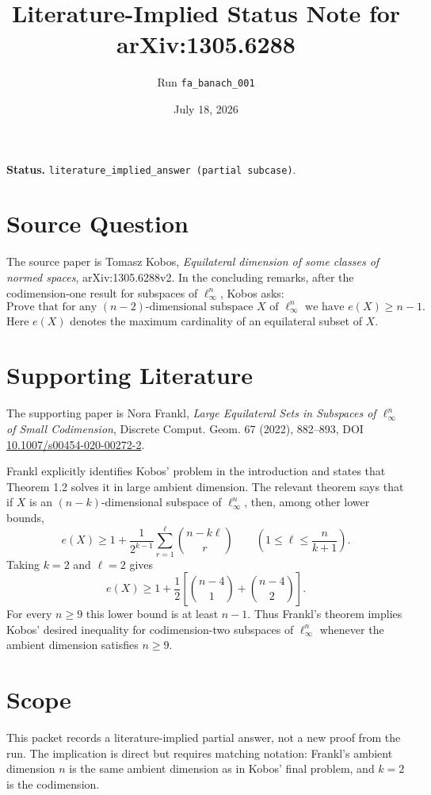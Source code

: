 \documentclass[11pt]{article}
\title{Literature-Implied Status Note for arXiv:1305.6288}
\author{Run \texttt{fa\_banach\_001}}
\date{July 18, 2026}
\begin{document}
\maketitle

\noindent\textbf{Status.}
\texttt{literature\_implied\_answer (partial subcase)}.

\section*{Source Question}

The source paper is Tomasz Kobos, \emph{Equilateral dimension of some classes
of normed spaces}, arXiv:1305.6288v2.  In the concluding remarks, after the
codimension-one result for subspaces of $\ell_\infty^n$, Kobos asks:
\[
\text{Prove that for any }(n-2)\text{-dimensional subspace }X
\text{ of }\ell_\infty^n\text{ we have }e(X)\ge n-1.
\]
Here $e(X)$ denotes the maximum cardinality of an equilateral subset of $X$.

\section*{Supporting Literature}

The supporting paper is Nora Frankl, \emph{Large Equilateral Sets in Subspaces
of $\ell_\infty^n$ of Small Codimension}, Discrete Comput. Geom. 67 (2022),
882--893, DOI
\href{https://doi.org/10.1007/s00454-020-00272-2}{10.1007/s00454-020-00272-2}.

Frankl explicitly identifies Kobos' problem in the introduction and states that
Theorem 1.2 solves it in large ambient dimension.  The relevant theorem says
that if $X$ is an $(n-k)$-dimensional subspace of $\ell_\infty^n$, then, among
other lower bounds,
\[
e(X)\ge
1+\frac{1}{2^{k-1}}\sum_{r=1}^{\ell}\binom{n-k\ell}{r}
\qquad
\left(1\le \ell\le \frac{n}{k+1}\right).
\]
Taking $k=2$ and $\ell=2$ gives
\[
e(X)\ge 1+\frac12\left[\binom{n-4}{1}+\binom{n-4}{2}\right].
\]
For every $n\ge 9$ this lower bound is at least $n-1$.  Thus Frankl's theorem
implies Kobos' desired inequality for codimension-two subspaces of
$\ell_\infty^n$ whenever the ambient dimension satisfies $n\ge 9$.

\section*{Scope}

This packet records a literature-implied partial answer, not a new proof from
the run.  The implication is direct but requires matching notation: Frankl's
ambient dimension $n$ is the same ambient dimension as in Kobos' final problem,
and $k=2$ is the codimension.
\end{document}
